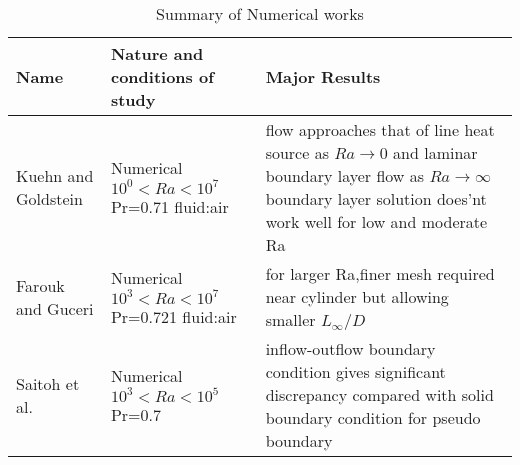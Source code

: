 \begin{table}[h]
\caption{Summary of Numerical works}
\label{tab:properties}
\begin{center}
\begin{tabular}{|p{3cm}|p{5cm}|p{6cm}|}
\hline
Name & Nature and conditions of study & Major Results \\
\hline
Kuehn and Goldstein & \pbox{5cm}{Numerical\\ $10^0<Ra<10^7$\\Pr=0.71\\fluid:air} & flow approaches that of line heat source as $Ra\rightarrow 0$ and laminar boundary layer flow as $Ra\rightarrow \infty$ boundary layer solution does'nt work well for low and moderate Ra \\
                   
\hline
Farouk and Guceri & \pbox{5cm}{ Numerical\\$10^3<Ra<10^7$\\Pr=0.721\\fluid:air} & for larger Ra,finer mesh required near cylinder but allowing smaller $L_\infty/D$ \\
                 
\hline
Saitoh et al. & \pbox{5cm}{ Numerical\\$10^3<Ra<10^5$\\Pr=0.7}& inflow-outflow boundary condition gives significant  discrepancy compared with solid boundary condition for pseudo boundary \\                              
\hline
\end{tabular}
\end{center}
\end{table}

